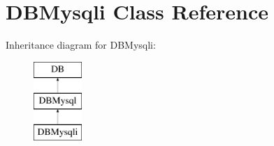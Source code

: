 \hypertarget{classDBMysqli}{\section{D\-B\-Mysqli Class Reference}
\label{classDBMysqli}
}
Inheritance diagram for D\-B\-Mysqli\-:\begin{figure}[H]
\begin{center}
\leavevmode
\includegraphics[height=3.000000cm]{classDBMysqli}
\end{center}
\end{figure}
